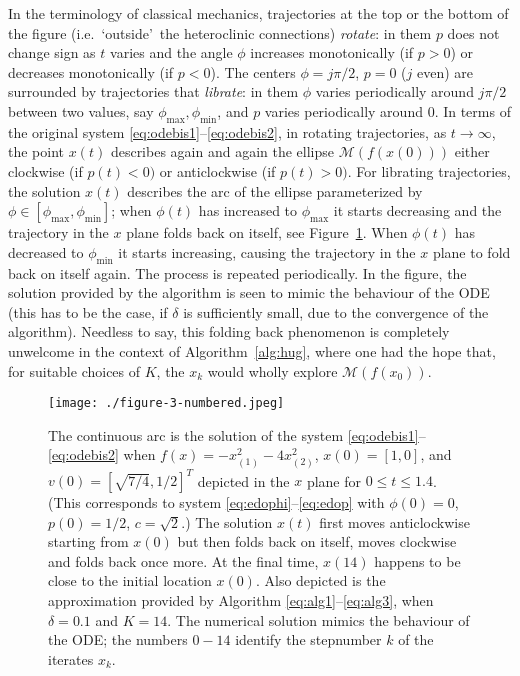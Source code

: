 \documentclass[10pt]{article}
\begin{document}
 In the terminology of classical mechanics, trajectories at the top or the bottom of the figure (i.e.\ \lq outside\rq\ the heteroclinic connections) \emph{rotate}: in them \(p\) does not change sign as \(t\) varies  and the angle \(\phi\) increases monotonically (if \(p>0\)) or decreases monotonically (if \(p<0\)). The centers \(\phi = j\pi/2\), \(p=0\) (\(j\) even) are surrounded by trajectories that \emph{librate}: in them \(\phi\) varies periodically around \(j\pi/2\) between two values, say \(\phi_{\max},\phi_{\min}\), and \(p\) varies periodically around \(0\). In terms of the original system \eqref{eq:odebis1}--\eqref{eq:odebis2}, in rotating trajectories, as \(t\rightarrow\infty\), the point \(x(t)\) describes again and again the ellipse \({\mathcal M}(f(x(0)))\) either clockwise (if \(p(t)<0)\) or anticlockwise (if \(p(t)>0)\). For librating trajectories, the solution \(x(t)\)  describes the arc of the ellipse parameterized by \(\phi\in[\phi_{\max},\phi_{\min}]\); when \(\phi(t)\) has increased to \(\phi_{\max}\) it starts decreasing and the trajectory in the \(x\) plane folds back on itself, see Figure~\ref{fig:folding}. When \(\phi(t)\) has decreased to \(\phi_{\min}\) it starts increasing, causing the trajectory in the \(x\) plane to fold back on itself again. The process is repeated periodically.
 In the figure, the solution  provided by the algorithm is seen to mimic the behaviour of the ODE (this has to be the case, if \(\delta\) is sufficiently small, due to the convergence of the algorithm). Needless to say, this folding back phenomenon is completely unwelcome in the context of Algorithm~\ref{alg:hug}, where one had the hope that, for suitable choices of \(K\), the \(x_k\) would wholly explore \({\mathcal M}(f(x_0))\).

\begin{figure}[t]
	\centering
	\texttt{[image: ./figure-3-numbered.jpeg]}
	\caption{The continuous arc is the solution of the system \eqref{eq:odebis1}--\eqref{eq:odebis2} when \(f(x) = -x_{(1)}^2-4x_{(2)}^2\),
 \(x(0)=[1,0]\), and \(v(0)= [\sqrt{7/4}, 1/2]^T\) depicted in the \(x\) plane for \(0\leq t \leq 1.4\). (This corresponds to system
\eqref{eq:edophi}--\eqref{eq:edop} with \(\phi(0) = 0\), \(p(0) = 1/2\), \(c=\sqrt{2}\).)
The solution \(x(t)\) first moves anticlockwise starting from \(x(0)\) but then folds back on itself, moves clockwise and folds back once more. At the final time, \(x(14)\) happens to be close to the initial location \(x(0)\). Also depicted is the approximation provided by Algorithm \eqref{eq:alg1}--\eqref{eq:alg3}, when \(\delta= 0.1\) and \(K=14\). The numerical solution mimics the behaviour of the ODE; the numbers \(0-14\) identify the stepnumber \(k\) of the iterates \(x_k\).}
	\label{fig:folding}
\end{figure}
\end{document}
